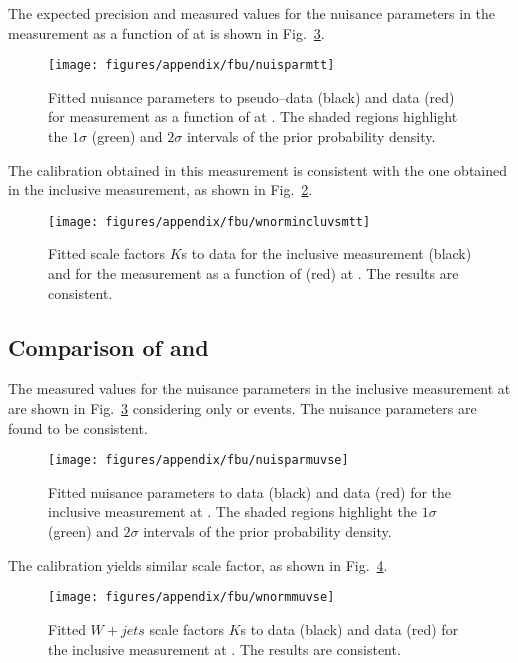 The expected precision and measured values for the nuisance parameters
in the measurement as a function of \mtt{} at \eighttev{} is shown in
Fig.~\ref{fig:nuisparmtt}.
\begin{figure}[!htb]\centering
  \texttt{[image: figures/appendix/fbu/nuisparmtt]}
  \caption{Fitted nuisance parameters to pseudo--data (black) and data
    (red) for \ac{} measurement as a function of \mtt{} at \eighttev{}. The
    shaded regions highlight the $1\sigma$ (green) and $2\sigma$
    intervals of the prior probability density.}
  \label{fig:nuisparmtt}
\end{figure}
The \wjets{} calibration obtained in this measurement is consistent
with the one obtained in the inclusive measurement, as shown in
Fig.~\ref{fig:wnormincluvsmtt}. 
\begin{figure}[!htb]\centering
  \texttt{[image: figures/appendix/fbu/wnormincluvsmtt]}
  \caption{Fitted \wjets{} scale factors $K$s to data for the inclusive
    measurement (black) and for the measurement as a function of
    \mtt{} (red) at \eighttev{}. The results are consistent.}
  \label{fig:wnormincluvsmtt}
\end{figure}

\subsection{Comparison of \mujets{} and \ejets{}}
\label{app:unf:evsmu}

The measured values for the nuisance parameters
in the inclusive measurement at \eighttev{} are shown in
Fig.~\ref{fig:nuisparmtt} considering only \mujets{} or \ejets{}
events. The nuisance parameters are found to be consistent.
\begin{figure}[!htb]\centering
  \texttt{[image: figures/appendix/fbu/nuisparmuvse]}
  \caption{Fitted nuisance parameters to \mujets{} data (black) and
    \ejets{} data (red) for the inclusive \ac{} measurement at \eighttev{}. The
    shaded regions highlight the $1\sigma$ (green) and $2\sigma$
    intervals of the prior probability density.}
  \label{fig:nuisparmtt}
\end{figure}
The \wjets{} calibration yields similar scale factor, as shown in
Fig.~\ref{fig:wnormmuvse}.
\begin{figure}[!htb]\centering
  \texttt{[image: figures/appendix/fbu/wnormmuvse]}
  \caption{Fitted $W+jets$ scale factors $K$s to \mujets{} data (black)
    and \ejets{} data (red) for the inclusive
    measurement at \eighttev{}. The results are consistent.}
  \label{fig:wnormmuvse}
\end{figure}

